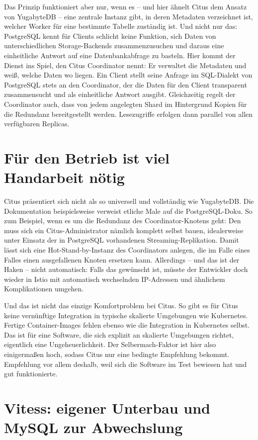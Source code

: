 Das Prinzip funktioniert aber nur, wenn es – und hier ähnelt Citus dem Ansatz von YugabyteDB – eine zentrale Instanz gibt, in deren Metadaten verzeichnet ist, welcher Worker für eine bestimmte Tabelle zuständig ist. Und nicht nur das: PostgreSQL kennt für Clients schlicht keine Funktion, sich Daten von unterschiedlichen Storage-Backends zusammenzusuchen und daraus eine einheitliche Antwort auf eine Datenbankabfrage zu basteln. Hier kommt der Dienst ins Spiel, den Citus Coordinator nennt: Er verwaltet die Metadaten und weiß, welche Daten wo liegen. Ein Client stellt seine Anfrage im SQL-Dialekt von PostgreSQL stets an den Coordinator, der die Daten für den Client transparent zusammensucht und als einheitliche Antwort ausgibt. Gleichzeitig regelt der Coordinator auch, dass von jedem angelegten Shard im Hintergrund Kopien für die Redundanz bereitgestellt werden. Lesezugriffe erfolgen dann parallel von allen verfügbaren Replicas.

\section{Für den Betrieb ist viel Handarbeit nötig}

Citus präsentiert sich nicht als so universell und vollständig wie YugabyteDB. Die Dokumentation beispielsweise verweist etliche Male auf die PostgreSQL-Doku. So zum Beispiel, wenn es um die Redundanz des Coordinator-Knotens geht: Den muss sich ein Citus-Administrator nämlich komplett selbst bauen, idealerweise unter Einsatz der in PostgreSQL vorhandenen Streaming-Replikation. Damit lässt sich eine Hot-Stand-by-Instanz des Coordinators anlegen, die im Falle eines Falles einen ausgefallenen Knoten ersetzen kann. Allerdings – und das ist der Haken – nicht automatisch: Falls das gewünscht ist, müsste der Entwickler doch wieder in Istio mit automatisch wechselnden IP-Adressen und ähnlichem Komplikationen umgehen.

Und das ist nicht das einzige Komfortproblem bei Citus. So gibt es für Citus keine vernünftige Integration in typische skalierte Umgebungen wie Kubernetes. Fertige Container-Images fehlen ebenso wie die Integration in Kubernetes selbst. Das ist für eine Software, die sich explizit an skalierte Umgebungen richtet, eigentlich eine Ungeheuerlichkeit. Der Selbermach-Faktor ist hier also einigermaßen hoch, sodass Citus nur eine bedingte Empfehlung bekommt. Empfehlung vor allem deshalb, weil sich die Software im Test bewiesen hat und gut funktionierte.

\section{Vitess: eigener Unterbau und MySQL zur Abwechslung}

